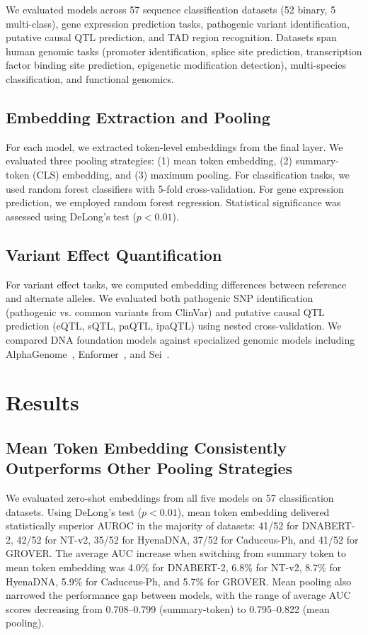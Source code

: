 \documentclass[11pt]{article}
\begin{document}
We evaluated models across 57 sequence classification datasets (52 binary, 5 multi-class), gene expression prediction tasks, pathogenic variant identification, putative causal QTL prediction, and TAD region recognition. Datasets span human genomic tasks (promoter identification, splice site prediction, transcription factor binding site prediction, epigenetic modification detection), multi-species classification, and functional genomics.

\subsection{Embedding Extraction and Pooling}

For each model, we extracted token-level embeddings from the final layer. We evaluated three pooling strategies: (1) mean token embedding, (2) summary-token (CLS) embedding, and (3) maximum pooling. For classification tasks, we used random forest classifiers with 5-fold cross-validation. For gene expression prediction, we employed random forest regression. Statistical significance was assessed using DeLong's test ($p < 0.01$).

\subsection{Variant Effect Quantification}

For variant effect tasks, we computed embedding differences between reference and alternate alleles. We evaluated both pathogenic SNP identification (pathogenic vs. common variants from ClinVar) and putative causal QTL prediction (eQTL, sQTL, paQTL, ipaQTL) using nested cross-validation. We compared DNA foundation models against specialized genomic models including AlphaGenome~\citep{benegas2024alphagenome}, Enformer~\citep{avsec2021effective}, and Sei~\citep{chen2022sequence}.

\section{Results}

\subsection{Mean Token Embedding Consistently Outperforms Other Pooling Strategies}

We evaluated zero-shot embeddings from all five models on 57 classification datasets. Using DeLong's test ($p < 0.01$), mean token embedding delivered statistically superior AUROC in the majority of datasets: 41/52 for DNABERT-2, 42/52 for NT-v2, 35/52 for HyenaDNA, 37/52 for Caduceus-Ph, and 41/52 for GROVER. The average AUC increase when switching from summary token to mean token embedding was 4.0\% for DNABERT-2, 6.8\% for NT-v2, 8.7\% for HyenaDNA, 5.9\% for Caduceus-Ph, and 5.7\% for GROVER. Mean pooling also narrowed the performance gap between models, with the range of average AUC scores decreasing from 0.708--0.799 (summary-token) to 0.795--0.822 (mean pooling).
\end{document}
